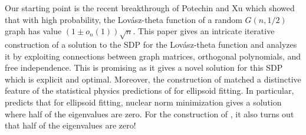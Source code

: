 \documentclass[12pt]{article}
\newcommand{\Lovasz}{Lov\'asz\xspace}
\begin{document}
Our starting point is the recent breakthrough of Potechin and Xu \cite{PotechinXu2026Theta} which showed that with high probability, the \Lovasz-theta function of a random $G(n,1/2)$ graph has value $(1 \pm{o_n(1)})\sqrt{n}$. This paper gives an intricate iterative construction of a solution to the SDP for the \Lovasz-theta function and analyzes it by exploiting connections between graph matrices, orthogonal polynomials, and free independence. This is promising as it gives a novel solution for this SDP which is explicit and optimal. Moreover, the construction of \cite{PotechinXu2026Theta} matched a distinctive feature of the statistical physics predictions of \cite{MD24} for ellipsoid fitting. In particular, \cite{MD24} predicts that for ellipsoid fitting, nuclear norm minimization gives a solution where half of the eigenvalues are zero. For the construction of \cite{PotechinXu2026Theta}, it also turns out that half of the eigenvalues are zero!

%
%
%
\end{document}
